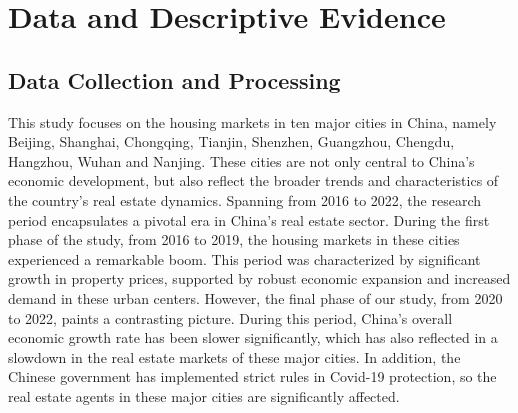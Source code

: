 \documentclass[11pt]{article}
\begin{document}
\section{Data and Descriptive Evidence \label{sec:data}}

\subsection{Data Collection and Processing} \label{subsec:data_collection}

This study focuses on the housing markets in ten major cities in China, namely Beijing, Shanghai, Chongqing, Tianjin, Shenzhen, Guangzhou, Chengdu, Hangzhou, Wuhan and Nanjing. These cities are not only central to China's economic development, but also reflect the broader trends and characteristics of the country's real estate dynamics. Spanning from 2016 to 2022, the research period encapsulates a pivotal era in China's real estate sector. During the first phase of the study, from 2016 to 2019, the housing markets in these cities experienced a remarkable boom. This period was characterized by significant growth in property prices, supported by robust economic expansion and increased demand in these urban centers. However, the final phase of our study, from 2020 to 2022, paints a contrasting picture. During this period, China's overall economic growth rate has been slower significantly, which has also reflected in a slowdown in the real estate markets of these major cities. In addition, the Chinese government has implemented strict rules in Covid-19 protection, so the real estate agents in these major cities are significantly affected.
\end{document}
